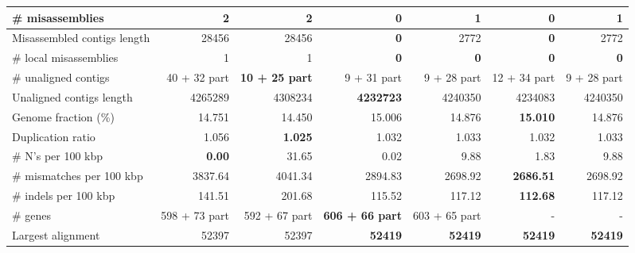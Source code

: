 \documentclass[12pt,a4paper]{article}
\begin{document}
\begin{table}[ht]
\begin{center}
\begin{tabular}{|l*{6}{|r}|}
\# misassemblies & 2 & 2 & {\bf 0} & 1 & {\bf 0} & 1 \\ \hline
Misassembled contigs length & 28456 & 28456 & {\bf 0} & 2772 & {\bf 0} & 2772 \\ \hline
\# local misassemblies & 1 & 1 & {\bf 0} & {\bf 0} & {\bf 0} & {\bf 0} \\ \hline
\# unaligned contigs & 40 + 32 part & {\bf 10 + 25 part} & 9 + 31 part & 9 + 28 part & 12 + 34 part & 9 + 28 part \\ \hline
Unaligned contigs length & 4265289 & 4308234 & {\bf 4232723} & 4240350 & 4234083 & 4240350 \\ \hline
Genome fraction (\%) & 14.751 & 14.450 & 15.006 & 14.876 & {\bf 15.010} & 14.876 \\ \hline
Duplication ratio & 1.056 & {\bf 1.025} & 1.032 & 1.033 & 1.032 & 1.033 \\ \hline
\# N's per 100 kbp & {\bf 0.00} & 31.65 & 0.02 & 9.88 & 1.83 & 9.88 \\ \hline
\# mismatches per 100 kbp & 3837.64 & 4041.34 & 2894.83 & 2698.92 & {\bf 2686.51} & 2698.92 \\ \hline
\# indels per 100 kbp & 141.51 & 201.68 & 115.52 & 117.12 & {\bf 112.68} & 117.12 \\ \hline
\# genes & 598 + 73 part & 592 + 67 part & {\bf 606 + 66 part} & 603 + 65 part & - & - \\ \hline
Largest alignment & 52397 & 52397 & {\bf 52419} & {\bf 52419} & {\bf 52419} & {\bf 52419} \\ \hline
\end{tabular}
\end{center}
\end{table}
\end{document}

